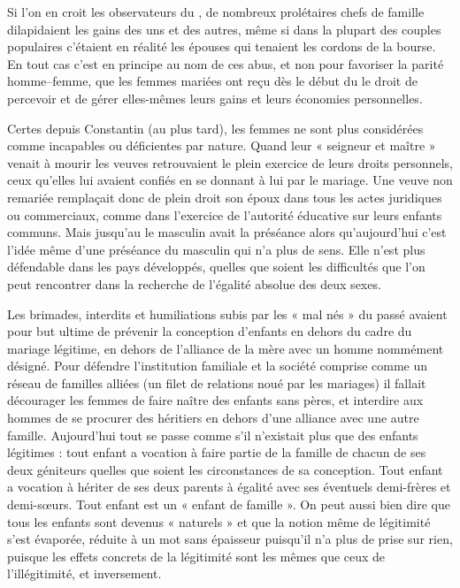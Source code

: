  Si l'on en croit les observateurs du , de nombreux prolétaires chefs de famille dilapidaient les gains des uns et des autres, même si dans la plupart des couples populaires c'étaient en réalité les épouses qui tenaient les cordons de la bourse. En tout cas c'est en principe au nom de ces abus, et non pour favoriser la parité homme--femme, que les femmes mariées ont reçu dès le début du  le droit de percevoir et de gérer elles-mêmes leurs gains et leurs économies personnelles.

 Certes depuis Constantin (au plus tard), les femmes ne sont plus considérées comme incapables ou déficientes par nature. Quand leur « seigneur et maître » venait à mourir les veuves  retrouvaient le plein exercice de leurs droits personnels, ceux qu'elles lui avaient confiés en se donnant à lui par le mariage. Une veuve non remariée remplaçait donc de plein droit son époux dans tous les actes juridiques ou commerciaux, comme dans l'exercice de l'autorité éducative sur leurs enfants communs. Mais jusqu'au  le masculin avait la préséance alors qu'aujourd'hui c'est l'idée même d'une préséance du masculin qui n'a plus de sens. Elle n'est plus défendable dans les pays développés, quelles que soient les difficultés que l'on peut rencontrer dans la recherche de l'égalité absolue des deux sexes.

 Les brimades, interdits et humiliations subis par les « mal nés » du passé avaient pour but ultime de prévenir la conception d'enfants en dehors du cadre du mariage légitime, en dehors de l'alliance de la mère avec un homme nommément désigné. Pour défendre l'institution familiale et la société comprise comme un réseau de familles alliées (un filet de relations noué par les mariages) il fallait décourager les femmes de faire naître des enfants sans pères, et interdire aux hommes de se procurer des héritiers en dehors d'une alliance avec une autre famille. Aujourd'hui tout se passe comme s'il n'existait plus que des enfants légitimes : tout enfant a vocation à faire partie de la famille de chacun de ses deux géniteurs quelles que soient les circonstances de sa conception. Tout enfant a vocation à hériter de ses deux parents à égalité avec ses éventuels demi-frères et demi-sœurs. Tout enfant est un « enfant de famille ». On peut aussi bien dire que tous les enfants sont devenus « naturels » et que la notion même de légitimité s'est évaporée, réduite à un mot sans épaisseur puisqu'il n'a plus de prise sur rien, puisque les effets concrets de la légitimité sont les mêmes que ceux de l'illégitimité, et inversement.
 
